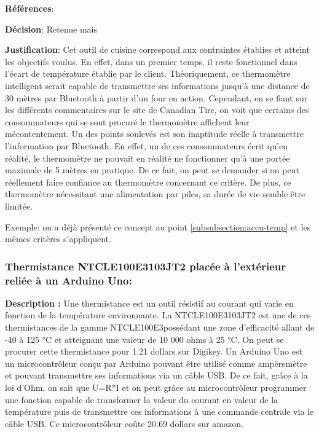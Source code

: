 \textbf{Références}: \cite{Ares} \cite{AmAc} \cite{CaAc} \vspace{5mm}

\textbf{Décision}: Retenue mais

\textbf{Justification}: Cet outil de cuisine correspond aux contraintes établies et atteint les objectifs voulus. En effet, dans un premier temps, il reste fonctionnel dans l’écart de température établie par le client. Théoriquement, ce thermomètre intelligent serait capable de transmettre ses informations jusqu’à une distance de 30 mètres par Bluetooth à partir d’un four en action. Cependant, en se fiant sur les différents commentaires sur le site de Canadian Tire, on voit que certains des consommateurs qui se sont procuré le thermomètre affichent leur mécontentement. Un des points soulevés est son inaptitude réelle à transmettre l’information par Bluetooth. En effet, un de ces consommateurs écrit qu’en réalité, le thermomètre ne pouvait en réalité ne fonctionner qu’à une portée maximale de 5 mètres en pratique. De ce fait, on peut se demander si on peut réellement faire confiance au thermomètre concernant ce critère. De plus, ce thermomètre nécessitant une alimentation par piles, sa durée de vie semble être limitée.

Exemple: on a déjà présenté ce concept au point \ref{subsubsection:accu-temp} et les mêmes critères s'appliquent.

\subsubsection{Thermistance NTCLE100E3103JT2 placée à l’extérieur reliée à un Arduino Uno:}
\label{thermis}

\textbf{Description :} Une thermistance est un outil résistif au courant qui varie en fonction de la température environnante. La NTCLE100E3103JT2 est une de ces thermistances de la gamme NTCLE100E3possédant une zone d’efficacité allant de -40 à 125 °C et atteignant une valeur de 10 000 ohms à 25 °C. On peut se procurer cette thermistance pour 1.21 dollars sur Digikey. Un Arduino Uno est un microcontrôleur conçu par Arduino pouvant être utilisé comme ampèremètre et pouvant transmettre ses informations via un câble USB. De ce fait, grâce à la loi d’Ohm, on sait que U=R*I et on peut grâce au microcontrôleur programmer une fonction capable de transformer la valeur du courant en valeur de la température puis de transmettre ces informations à une commande centrale via le câble USB. Ce microcontrôleur coûte 20.69 dollars sur amazon. 

